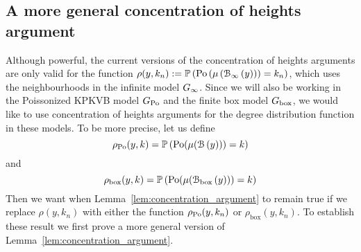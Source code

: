 %
%
%

\subsection{A more general concentration of heights argument}\label{ssec:general_concentration_lemma}

Although powerful, the current versions of the concentration of heights arguments are only valid for the function $\rho(y,k_n) := \mathbb{P}\left({\mathrm{Po}}\left(\mu\left({\mathcal B}_{\infty}\left(y\right)\right)\right) = k_n\right)$, which uses the neighbourhoods in the infinite model $G_{\infty}$. 
Since we will also be working in the Poissonized KPKVB model $G_{{\mathrm{Po}}}$ and the finite box model $G_{\mathrm{box}}$, we would like to use concentration of heights arguments for the degree distribution function in these models. To be more precise, let us define
\[
	\rho_{{\mathrm{Po}}}(y,k) = \mathbb{P}\left({\mathrm{Po}}(\mu({\mathcal B}\left(y\right))) = k\right)
\] 
and
\[
	\rho_{\mathrm{box}}(y,k) = \mathbb{P}\left({\mathrm{Po}}(\mu({\mathcal B}_{\text{box}}\left(y\right))) = k\right)
\] 
Then we want when Lemma~\ref{lem:concentration_argument} to remain true if we replace $\rho(y,k_n)$ with either the function $\rho_{{\mathrm{Po}}}(y,k_n)$ or $\rho_{\text{box}}(y,k_n)$. To establish these result we first prove a more general version of Lemma~\ref{lem:concentration_argument}.

